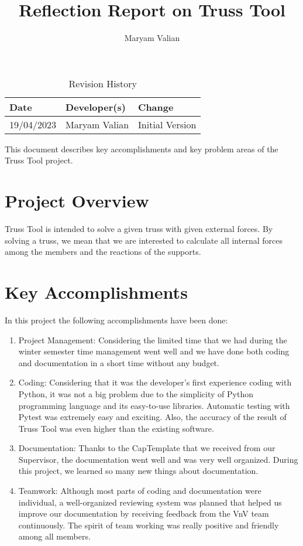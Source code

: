 \documentclass{article}
\title{Reflection Report on Truss Tool}
\author{Maryam Valian}
\date{}
\begin{document}
\begin{table}[hp]
\caption{Revision History} \label{TblRevisionHistory}
\begin{tabularx}{\textwidth}{llX}
\toprule
\textbf{Date} & \textbf{Developer(s)} & \textbf{Change}\\
\midrule
19/04/2023 & Maryam Valian & Initial Version\\

\bottomrule
\end{tabularx}
\end{table}

\newpage

\maketitle

This document describes key accomplishments and key problem areas of the Truss Tool project.
\section{Project Overview}

Truss Tool is intended to solve a given truss with given external forces. By solving a truss,
we mean that we are interested to calculate all internal forces among the members and the
reactions of the supports.

\section{Key Accomplishments}

In this project the following accomplishments have been done:
\begin{enumerate}
    \item Project Management: Considering the limited time that we had during the winter semester time management went well and we have done both coding and documentation in a short time without any budget.
    \item Coding: Considering that it was the developer's first experience coding with Python, it was not a big problem due to the simplicity of Python programming language and its easy-to-use libraries. Automatic testing with Pytest was extremely easy and exciting. Also, the accuracy of the result of Truss Tool was even higher than the existing software.
    \item Documentation: Thanks to the CapTemplate that we received from our Supervisor, the documentation went well and was very well organized. During this project, we learned so many new things about documentation.
    \item Teamwork: Although most parts of coding and documentation were individual, a well-organized reviewing system was planned that helped us improve our documentation by receiving feedback from the VnV team continuously. The spirit of team working was really positive and friendly among all members.
\end{enumerate}
\end{document}
